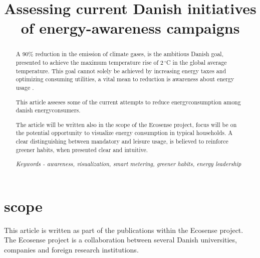 \documentclass[journal]{IEEEtran}
\begin{document}
%
\title{Assessing current Danish initiatives of energy-awareness campaigns }


\author{
}









\maketitle


\begin{abstract}
A 90\% reduction in the emission of climate gases, is the ambitious Danish goal, presented to achieve the maximum temperature rise of 2$\,^{\circ}$C  in the global average temperature. This goal cannot solely be achieved by increasing energy taxes and optimizing consuming utilities, a vital mean to reduction is awareness about energy usage	. 

This article asseses some of the current attempts to reduce energyconsumption among danish energyconsumers.

The article will be written also in the scope of the Ecosense project, focus will be on the potential opportunity to visualize energy consumption in typical households. A clear distinguishing between mandatory and leisure usage, is believed to reinforce greener habits, when presented clear and intuitive.

\textit{Keywords - awareness, visualization, smart metering, greener habits, energy leadership}
\end{abstract}

\section{scope}
This article is written as part of the publications within the Ecosense project. The Ecosense project is a collaboration between several Danish universities, companies and foreign research institutions. 
\end{document}
